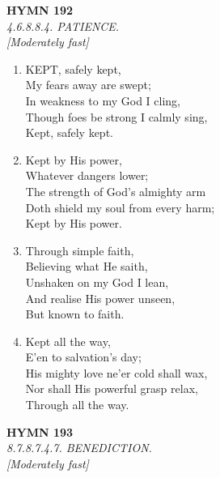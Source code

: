 \documentclass[11pt,a4paper]{article}
\begin{document}
\newpage
\begin{center}
    {\Large \textbf{HYMN 192}}
    \\
    \textit{4.6.8.8.4. PATIENCE.}
    \\
    \textit{\small [Moderately fast]}
\end{center}
\vspace{1em}

\begin{enumerate}
    \item KEPT, safely kept, \\
        My fears away are swept; \\
        In weakness to my God I cling, \\
        Though foes be strong I calmly sing, \\
        Kept, safely kept.

    \item Kept by His power, \\
        Whatever dangers lower; \\
        The strength of God's almighty arm \\
        Doth shield my soul from every harm; \\
        Kept by His power.

    \item Through simple faith, \\
        Believing what He saith, \\
        Unshaken on my God I lean, \\
        And realise His power unseen, \\
        But known to faith.

    \item Kept all the way, \\
        E'en to salvation's day; \\
        His mighty love ne'er cold shall wax, \\
        Nor shall His powerful grasp relax, \\
        Through all the way.

\end{enumerate}

\newpage
\begin{center}
    {\Large \textbf{HYMN 193}}
    \\
    \textit{8.7.8.7.4.7. BENEDICTION.}
    \\
    \textit{\small [Moderately fast]}
\end{center}
\vspace{1em}
\end{document}
